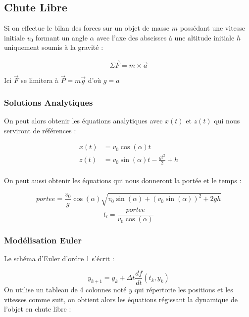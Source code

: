\documentclass[a4paper,oneside]{article}
\begin{document}
\subsection{Chute Libre}

Si on effectue le bilan des forces sur un objet de masse $m$ possédant une vitesse initiale $v_0$ formant un angle $\alpha$ avec l'axe des abscisses à une altitude initiale $h$ uniquement soumis à la gravité :

\begin{equation*}
\Sigma \vec{F} = m \times \vec{a}
\end{equation*}

Ici $\vec{F}$ se limitera à $\vec{P} = m \vec{g}$ d'où $g=a$

\subsubsection{Solutions Analytiques}

On peut alors obtenir les équations analytiques avec $x(t)$ et $z(t)$ qui nous serviront de références :

\begin{align*}
x(t) &= v_0\cos(\alpha)t \\
z(t) &= v_0\sin(\alpha)t - \frac{gt^2}{2} + h\\
\end{align*}

On peut aussi obtenir les équations qui nous donneront la portée et le temps :

\begin{equation*}
portee = \frac{v_0}{g} \cos(\alpha) \sqrt{v_0 \sin(\alpha) +(v_0\sin(\alpha))^2 + 2gh}
\end{equation*}
\begin{equation*}
t_l = \frac{portee}{v_0\cos(\alpha)}	
\end{equation*}

\subsubsection{Modélisation Euler}
Le schéma d'Euler d'ordre 1 s'écrit : 

\begin{equation*}
y_{k+1} = y_{k}+ \Delta t \frac{df}{dt}(t_{k},y_{k})
\end{equation*}
On utilise un tableau de 4 colonnes noté $y$ qui répertorie les positions et les vitesses comme suit, on obtient alors les équations régissant la dynamique de l'objet en chute libre :
\end{document}

